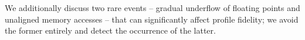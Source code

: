 %    
%    
%    
%    
%    

We additionally discuss two rare events --
gradual underflow of floating points and unaligned memory accesses -- 
that can significantly affect profile fidelity;
we avoid the former entirely and detect the occurrence of the latter.

%
%

